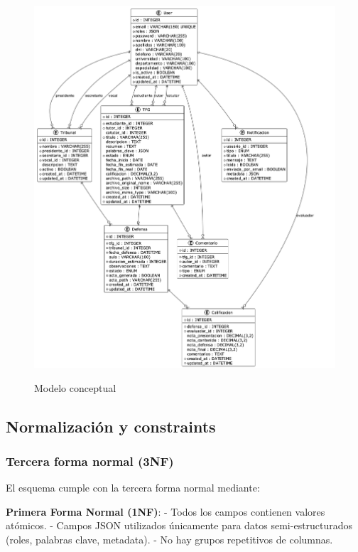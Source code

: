 \documentclass[12pt,a4paper,oneside]{report}
\providecommand{\pandocbounded}[1]{#1}
\begin{document}
\begin{figure}
\centering
\pandocbounded{\includegraphics[keepaspectratio,alt={Modelo conceptual}]{processed/images/05_diseno_plantuml_3.png}}
\caption{Modelo conceptual}
\end{figure}

\subsection{Normalización y
constraints}\label{normalizaciuxf3n-y-constraints}

\subsubsection{Tercera forma normal
(3NF)}\label{tercera-forma-normal-3nf}

El esquema cumple con la tercera forma normal mediante:

\textbf{Primera Forma Normal (1NF)}: - Todos los campos contienen
valores atómicos. - Campos JSON utilizados únicamente para datos
semi-estructurados (roles, palabras clave, metadata). - No hay grupos
repetitivos de columnas.
\end{document}
